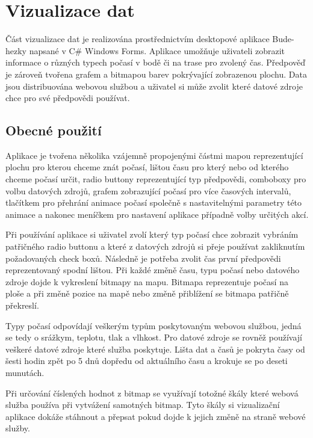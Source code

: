 \documentclass[czech,bachelor,dept460,male,csharp,cpdeclaration]{diploma}
\begin{document}
	\chapter{Vizualizace dat}
	
	Část vizualizace dat je realizována prostřednictvím desktopové aplikace Bude-hezky napsané v C\# Windows Forms. Aplikace umožňuje uživateli zobrazit informace o různých typech počasí v bodě či na trase pro zvolený čas. Předpověď je zároveň tvořena grafem a bitmapou barev pokrývající zobrazenou plochu. Data jsou distribuována webovou službou a uživatel si může zvolit které datové zdroje chce pro své předpovědi používat.
	
	\section{Obecné použití}
	
	Aplikace je tvořena několika vzájemně propojenými částmi mapou reprezentující plochu pro kterou chceme znát počasí, lištou času pro který nebo od kterého chceme počasí určit, radio buttony reprezentující typ předpovědi, comboboxy pro volbu datových zdrojů, grafem zobrazující počasí pro více časových intervalů, tlačítkem pro přehrání animace počasí společně s nastavitelnými parametry této animace a nakonec meníčkem pro nastavení aplikace případně volby určitých akcí.
	
	Při používání aplikace si uživatel zvolí který typ počasí chce zobrazit vybráním patřičného radio buttonu a které z datových zdrojů si přeje používat zakliknutím požadovaných check boxů. Následně je potřeba zvolit čas první předpovědi reprezentovaný spodní lištou. Při každé změně času, typu počasí nebo datového zdroje dojde k vykreslení bitmapy na mapu. Bitmapa reprezentuje počasí na ploše a při změně pozice na mapě nebo změně přiblížení se bitmapa patřičně překreslí.
	
	Typy počasí odpovídají veškerým typům poskytovaným webovou službou, jedná se tedy o srážkym, teplotu, tlak a vlhkost. Pro datové zdroje se rovněž používají veškeré datové zdroje které služba poskytuje. Lišta dat a časů 
	je pokryta časy od šesti hodin zpět po 5 dnů dopředu od aktuálního času a krokuje se po deseti munutách.
	
	Při určování číslených hodnot z bitmap se využívají totožné škály které webová služba používa při vytvážení samotných bitmap. Tyto škály si vizualizační aplikace dokáže stáhnout a přepsat pokud dojde k jejich změně na straně webové služby.
	
\end{document}

